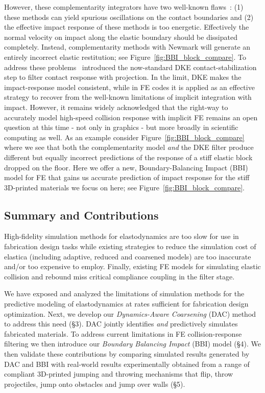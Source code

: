 However, these complementarity integrators have two well-known flaws~\cite{Deuflhard:2008fu}: (1) these methods can yield spurious oscillations on the contact boundaries and (2) the effective impact response of these methods is too energetic. Effectively the normal velocity on impact along the elastic boundary should be dissipated completely. Instead, complementarity methods with Newmark will generate an entirely incorrect elastic restitution; see Figure~\ref{fig:BBI_block_compare}. To address these problems~\citet{Deuflhard:2008fu} introduced the now-standard DKE contact-stabilization step to filter contact response with projection. In the limit, DKE makes the impact-response model consistent,
while in FE codes it is applied as an effective strategy to recover from the well-known limitations of implicit integration with impact. However, it remains widely acknowledged that the right-way to accurately model high-speed collision response with implicit FE remains an open question at this time - not only in graphics - but more broadly in scientific computing as well. As an example consider Figure~\ref{fig:BBI_block_compare} where we see that both the complementarity model \emph{and} the DKE filter produce different but equally incorrect predictions of the response of a stiff elastic block dropped on the floor. Here we offer a new, Boundary-Balancing Impact (BBI) model for FE that gains us accurate prediction of impact response for the stiff 3D-printed materials we focus on here; see Figure~\ref{fig:BBI_block_compare}.

\subsection{Summary and Contributions}
High-fidelity simulation methods for elastodynamics are too slow for use in fabrication design tasks while existing strategies to reduce the simulation cost of elastica (including adaptive, reduced and coarsened models) are too inaccurate and/or too expensive to employ. Finally, existing FE models for simulating elastic collision and rebound miss critical compliance coupling in the filter stage.

We have exposed and analyzed the limitations of simulation methods for the predictive modeling of elastodynamics at rates sufficient for fabrication design optimization. Next, we develop our \emph{Dynamics-Aware Coarsening} (DAC) method to address this need {(\S3)}. DAC jointly identifies \emph{and} predictively simulates fabricated materials. To address current limitations in FE collision-response filtering we then introduce our \emph{Boundary Balancing Impact} (BBI) model {(\S4)}. 
We then validate these contributions by comparing simulated results generated by DAC and BBI with real-world results experimentally obtained from a range of compliant 3D-printed jumping and throwing mechanisms that flip, throw projectiles, jump onto obstacles and jump over walls (\S5).
